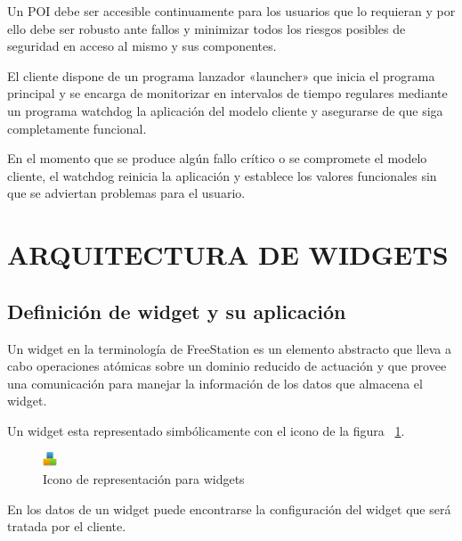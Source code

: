 Un POI debe ser accesible continuamente para los usuarios que lo requieran y
por ello debe ser robusto ante fallos y minimizar todos los riesgos posibles de
seguridad en acceso al mismo y sus componentes.

El cliente dispone de un programa lanzador «launcher» que inicia el programa
principal y se encarga de monitorizar en intervalos de tiempo regulares
mediante un programa watchdog la aplicación del modelo cliente y asegurarse de
que siga completamente funcional.

En el momento que se produce algún fallo crítico o se compromete el modelo
cliente, el watchdog reinicia la aplicación y establece los valores
funcionales sin que se adviertan problemas para el usuario.

\section{\uppercase{Arquitectura de widgets}}

\subsection{Definición de widget y su aplicación}

Un widget en la terminología de FreeStation es un elemento abstracto que lleva a
cabo operaciones atómicas sobre un dominio reducido de actuación y que provee
una comunicación para manejar la información de los datos que almacena el
widget.

Un widget esta representado simbólicamente con el icono de la figura
~\ref{fig:widgeticon}.

\begin{figure}[ht]
    \begin{center}
        \includegraphics[width=16px]{src/img/widgets.png}
        \caption[Icono de representación para widgets] {Icono de representación para widgets}
        \label{fig:widgeticon}
    \end{center}
\end{figure}

\newpage

En los datos de un widget puede encontrarse la configuración del widget que será
tratada por el cliente.

